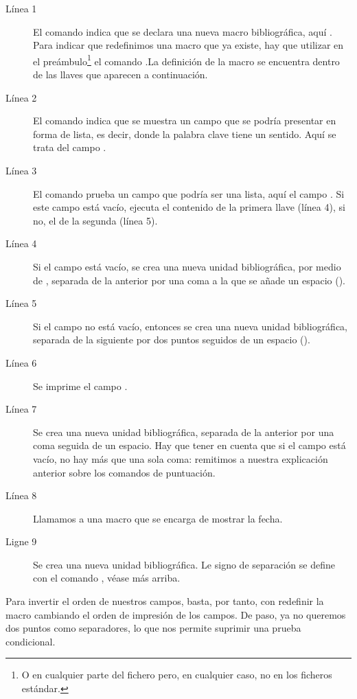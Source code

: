 \begin{description}
\item[Línea 1] El comando  indica que se declara una nueva macro bibliográfica, aquí .  Para indicar que redefinimos una macro que ya existe, hay que utilizar en el preámbulo\footnote{O en cualquier parte del fichero  pero, en cualquier caso, no en los ficheros estándar.} el comando .La definición de la macro se encuentra dentro de las llaves que aparecen a continuación.
\item[Línea 2] El comando  indica que se muestra un campo que se podría presentar en forma de lista, es decir, donde la palabra clave  tiene un sentido. Aquí se trata del campo .
\item[Línea 3] El comando  prueba un campo que podría ser una lista, aquí el campo . Si este campo está vacío, ejecuta el contenido de la primera llave (línea 4), si no, el de la segunda (línea 5).%
\item[Línea 4] Si el campo  está vacío, se crea una nueva unidad bibliográfica, por medio de  ,\label{unitepersonalisee} separada de la anterior por una coma a la que se añade un espacio ().
\item[Línea 5] Si el campo  no está vacío, entonces se crea una nueva unidad bibliográfica, separada de la siguiente por dos puntos seguidos de un espacio ().
\item[Línea 6] Se imprime el campo .
\item[Línea 7] Se crea una nueva unidad bibliográfica, separada de la anterior por una coma seguida de un espacio. Hay que tener en cuenta que si el campo  está vacío, no hay más que una sola coma: remitimos a nuestra explicación anterior sobre los comandos de puntuación.
\item[Línea 8] Llamamos a una macro que se encarga de mostrar la fecha.
\item[Ligne 9] Se crea una nueva unidad bibliográfica. Le signo de separación se define con el comando , véase más arriba.
\end{description}

Para invertir el orden de nuestros campos, basta, por tanto, con redefinir la macro cambiando el orden de impresión de los campos. De paso, ya no queremos dos puntos como separadores, lo que nos permite suprimir una prueba condicional.


